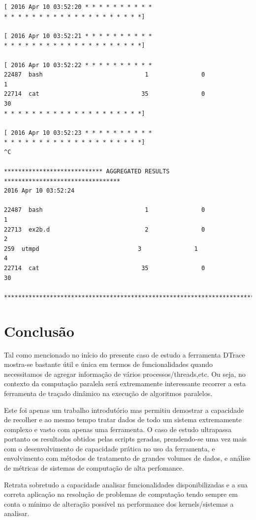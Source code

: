 \documentclass[a4paper]{article}
\begin{document}
\begin{lstlisting}[basicstyle=\scriptsize]
[ 2016 Apr 10 03:52:20 * * * * * * * * * * 
* * * * * * * * * * * * * * * * * * * *]

[ 2016 Apr 10 03:52:21 * * * * * * * * * * 
* * * * * * * * * * * * * * * * * * * *]

[ 2016 Apr 10 03:52:22 * * * * * * * * * * 
22487  bash                             1               0               1
22714  cat                             35               0              30
* * * * * * * * * * * * * * * * * * * *]

[ 2016 Apr 10 03:52:23 * * * * * * * * * * 
* * * * * * * * * * * * * * * * * * * *]
^C

**************************** AGGREGATED RESULTS *********************************
2016 Apr 10 03:52:24 

22487  bash                             1               0               1
22713  ex2b.d                           2               0               2
259  utmpd                            3               1               4
22714  cat                             35               0              30

*********************************************************************************
\end{lstlisting}



\newpage
\section{Conclusão}
Tal como mencionado no início do presente caso de estudo a ferramenta DTrace mostra-se bastante útil e única em termos de funcionalidades quando necessitamos de agregar informação de vários processos/threads,etc. Ou seja, no contexto da computação paralela será extremamente interessante recorrer a esta ferramenta de traçado dinâmico na execução de algoritmos paralelos. \par 
Este foi apenas um trabalho introdutório mas permitiu demostrar a capacidade de recolher e ao mesmo tempo tratar dados de todo um sistema extremamente complexo e vasto com apenas uma ferramenta. O caso de estudo ultrapassa portanto os resultados obtidos pelas scripts geradas, prendendo-se uma vez mais com o desenvolvimento de capacidade  prática no uso da ferramenta, e envolvimento com métodos de tratamento de grandes volumes de dados, e análise de métricas de sistemas de computação de alta perfomance.\par Retrata sobretudo a capacidade analisar funcionalidades disponibilizadas e a sua correta aplicação na resolução de problemas de computação tendo sempre em conta o mínimo de alteração possível na performance dos kernels/sistemas a analisar.
\end{document}
